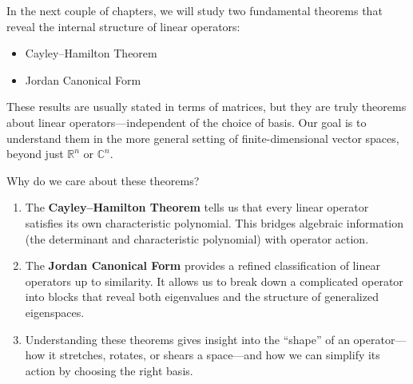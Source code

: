 In the next couple of chapters, we will study two fundamental theorems that reveal the internal structure of linear operators:

\begin{itemize}
  \item Cayley–Hamilton Theorem
  \item Jordan Canonical Form
\end{itemize}

These results are usually stated in terms of matrices, but they are truly theorems about linear operators—independent of the choice of basis. Our goal is to understand them in the more general setting of finite-dimensional vector spaces, beyond just \( \mathbb{R}^n \) or \( \mathbb{C}^n \).

\begin{remark}
Why do we care about these theorems?

\begin{enumerate}
  \item The \textbf{Cayley–Hamilton Theorem} tells us that every linear operator satisfies its own characteristic polynomial. This bridges algebraic information (the determinant and characteristic polynomial) with operator action.

  \item The \textbf{Jordan Canonical Form} provides a refined classification of linear operators up to similarity. It allows us to break down a complicated operator into blocks that reveal both eigenvalues and the structure of generalized eigenspaces.

  \item Understanding these theorems gives insight into the “shape” of an operator—how it stretches, rotates, or shears a space—and how we can simplify its action by choosing the right basis.
\end{enumerate}
\end{remark}